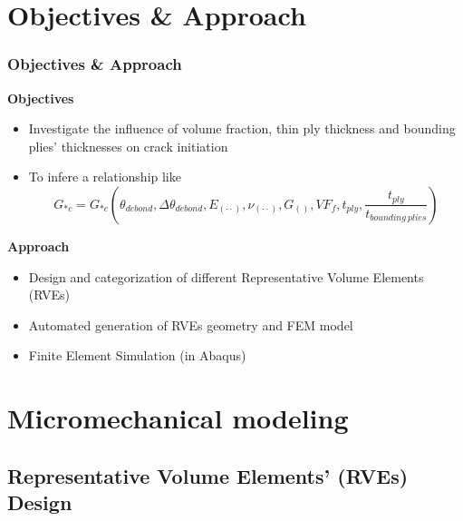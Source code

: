 \documentclass[first,firstsupp,lastsupp,handout,last,hyperref,table]{ETHclass}
\begin{document}
\section{Objectives \& Approach}

\begin{frame}
\frametitle{Objectives \& Approach}
\vspace{-0.25cm}
\centering
\scriptsize
\begin{alertblock}{\small \bf{Objectives}}
\begin{itemize}
    \item Investigate the influence of volume fraction, thin ply thickness and bounding plies' thicknesses on crack initiation 
    \item To infere a relationship like
	\begin{equation*}
		G_{*c}=G_{*c}\left(\theta_{debond},\Delta\theta_{debond}, E_{\left(\cdot\cdot\right)}, \nu_{\left(\cdot\cdot\right)}, G_{\left(\right)},VF_{f}, t_{ply}, \frac{t_{ply}}{t_{bounding\ plies}}\right)
	\end{equation*}
\end{itemize}
\end{alertblock}
\begin{alertblock}{\small \bf{Approach}}
\begin{itemize}
    \item Design and categorization of different Representative Volume Elements (RVEs)
    \item Automated generation of RVEs geometry and FEM model
    \item Finite Element Simulation (in Abaqus)
\end{itemize}
\end{alertblock}
\end{frame}

\section{Micromechanical modeling}

\subsection[RVEs' Design]{Representative Volume Elements' (RVEs) Design}
\end{document}
